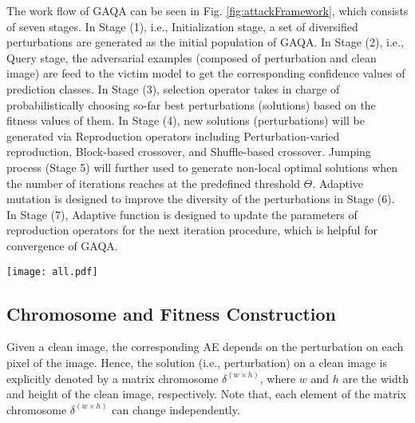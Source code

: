 \documentclass[lettersize,journal]{IEEEtran}
\begin{document}
	The work flow of GAQA can be seen in Fig. \ref{fig:attackFramework}, which consists of seven stages. In Stage (1), i.e., Initialization stage, a set of diversified perturbations are generated as the initial population of GAQA. In Stage (2), i.e., Query stage, the adversarial examples (composed of perturbation and clean image) are feed to the victim model to get the corresponding confidence values of prediction classes.  In Stage (3), selection operator takes in charge of probabilistically choosing so-far best perturbations (solutions) based on the fitness values of them. In Stage (4), new solutions (perturbations) will be generated via Reproduction operators including Perturbation-varied reproduction, Block-based crossover, and Shuffle-based crossover.  Jumping process (Stage 5) will further used to generate non-local optimal solutions when the number of iterations reaches at the predefined threshold $\Theta$. Adaptive mutation is designed to improve the diversity of the perturbations in Stage (6). In Stage (7), Adaptive function is designed to update the parameters of reproduction operators for the next iteration procedure, which is helpful for convergence of GAQA.  
	
	\begin{figure*}[tb]
		\centering
		\texttt{[image: all.pdf]}
		\caption{Attack framework of GAQA}  
		\label{fig:attackFramework}
	\end{figure*}		
	
	
	\subsection{Chromosome and Fitness Construction}
	Given a clean image, the corresponding AE depends on the perturbation on each pixel of the image. Hence, the solution (i.e., perturbation) on a clean image is explicitly denoted by a matrix chromosome $\delta^{( w \times h)}$, where $w$ and $h$ are the width and height of the clean image, respectively. Note that, each element of the matrix chromosome $\delta^{( w \times h)}$ can change independently. 
	
\end{document}
